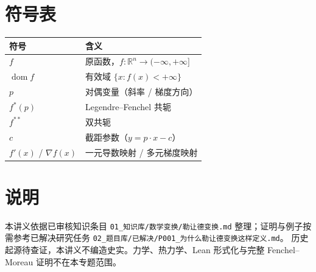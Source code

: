\documentclass[
    lang=cn,
    color=blue,
    mode=fancy,
    thmcnt=section,
    scheme=chinese,
    chinesefont=ctexfont
]{elegantbook}
\newcommand{\R}{\mathbb{R}}
\DeclareMathOperator{\dom}{dom}
\newcommand{\fstarp}{f^{\ast}(p)}
\newcommand{\fstardd}{f^{\ast\ast}}
\begin{document}
\chapter{符号表}

\begin{center}
\begin{tabular}{ll}
\toprule
符号 & 含义 \\
\midrule
$f$ & 原函数，$f:\R^{n}\to(-\infty,+\infty]$ \\
$\dom f$ & 有效域 $\{x:f(x)<+\infty\}$ \\
$p$ & 对偶变量（斜率 / 梯度方向） \\
$\fstarp$ & Legendre--Fenchel 共轭 \\
$\fstardd$ & 双共轭 \\
$c$ & 截距参数（$y=p\cdot x-c$） \\
$f'(x)$ / $\nabla f(x)$ & 一元导数映射 / 多元梯度映射 \\
\bottomrule
\end{tabular}
\end{center}


\backmatter

\chapter*{说明}

本讲义依据已审核知识条目
\texttt{01\_知识库/数学变换/勒让德变换.md}
整理；证明与例子按需参考已解决研究任务
\texttt{02\_题目库/已解决/P001\_为什么勒让德变换这样定义.md}。
历史起源待查证，本讲义不编造史实。力学、热力学、Lean 形式化与完整 Fenchel--Moreau 证明不在本专题范围。
\end{document}
